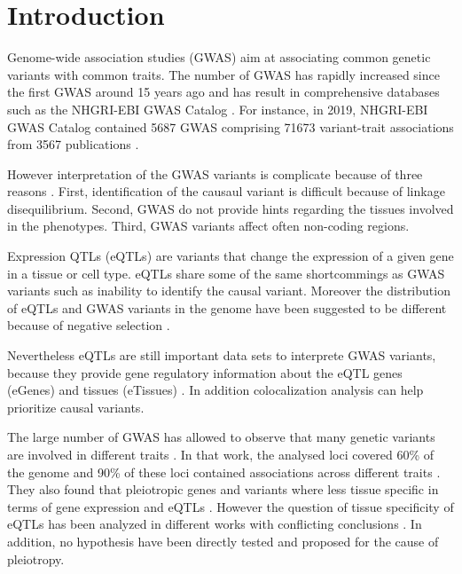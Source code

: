 \section*{Introduction}\label{sec:introduction}

Genome-wide association studies (GWAS) aim at associating common genetic variants with common traits.
%
The number of GWAS has rapidly increased since the first GWAS around 15 years ago and has result in comprehensive databases such as the NHGRI-EBI GWAS Catalog \citep{2007...Nature,2018.Parkinson.Buniello}.
%
For instance, in 2019, NHGRI-EBI GWAS Catalog contained 5687 GWAS comprising 71673 variant-trait associations from 3567 publications \citep{2018.Parkinson.Buniello}.

However interpretation of the GWAS variants is complicate because of three reasons \citep{2020.Trynka.CanoGamez}.
%
First, identification of the causaul variant is difficult because of linkage disequilibrium.
%
Second, GWAS do not provide hints regarding the tissues involved in the phenotypes.
%
Third, GWAS variants affect often non-coding regions.

Expression QTLs (eQTLs) are variants that change the expression of a given gene in a tissue or cell type.
%
eQTLs share some of the same shortcommings as GWAS variants such as inability to identify the causal variant.
%
Moreover the distribution of eQTLs and GWAS variants in the genome have been suggested to be different because of negative selection \citep{2022.Pritchard.Mostafavi}.

Nevertheless eQTLs are still important data sets to interprete GWAS variants, because they provide gene regulatory information about the eQTL genes (eGenes) and tissues (eTissues) \citep{2021.Li.Mu.GenomeBiology.impactcelltype}.
%
In addition colocalization analysis can help prioritize causal variants.

The large number of GWAS has allowed to observe that many genetic variants are involved in different traits \citep{2019.Posthuma.Watanabe}.
%
In that work, the analysed loci covered 60\% of the genome and 90\% of these loci contained associations across different traits \citep{2019.Posthuma.Watanabe}.
%
They also found that pleiotropic genes and variants where less tissue specific in terms of gene expression and eQTLs \citep{2019.Posthuma.Watanabe}.
%
However the question of tissue specificity of eQTLs has been analyzed in different works with conflicting conclusions \citep{2021.Li.Mu.GenomeBiology.impactcelltype,2018.Vijayanand.Schmiedel.Cell.ImpactGeneticPolymorphisms,2017...Nature}.
%
In addition, no hypothesis have been directly tested and proposed for the cause of pleiotropy.

